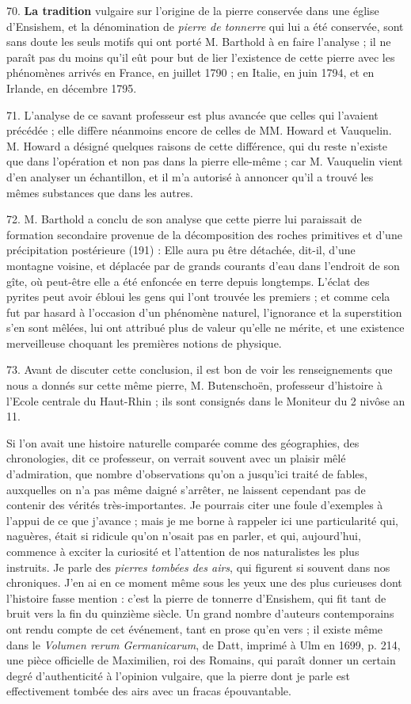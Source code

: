 \documentclass[a4paper, 11pt, oneside, polutonikogreek, french]{article}
\begin{document}
70. \textbf{La tradition} vulgaire sur l'origine de la pierre conservée dans une église d'Ensishem, et la dénomination de \emph{pierre de tonnerre} qui lui a été conservée, sont sans doute les seuls motifs qui ont porté M. Barthold à en faire l'analyse ; il ne paraît pas du moins qu'il eût pour but de lier l'existence de cette pierre avec les phénomènes arrivés en France, en juillet 1790 ; en Italie, en juin 1794, et en Irlande, en décembre 1795.

71. L'analyse de ce savant professeur est plus avancée que celles qui l'avaient précédée ; elle diffère néanmoins encore de celles de MM. Howard et Vauquelin. M. Howard a désigné quelques raisons de cette différence, qui du reste n'existe que dans l'opération et non pas dans la pierre elle-même ; car M. Vauquelin vient d'en analyser un échantillon, et il m'a autorisé à annoncer qu'il a trouvé les mêmes substances que dans les autres.

72. M. Barthold a conclu de son analyse que cette pierre lui paraissait de formation secondaire provenue de la décomposition des roches primitives et d'une précipitation postérieure (191) : \og Elle aura pu être détachée, dit-il, d'une montagne voisine, et déplacée par de grands courants d'eau dans l'endroit de son gîte, où peut-être elle a été enfoncée en terre depuis longtemps. L'éclat des pyrites peut avoir ébloui les gens qui l'ont trouvée les premiers ; et comme cela fut par hasard à l'occasion d'un phénomène naturel, l'ignorance et la superstition s'en sont mêlées, lui ont attribué plus de valeur qu'elle ne mérite, et une existence merveilleuse choquant les premières notions de physique. \fg

73. Avant de discuter cette conclusion, il est bon de voir les renseignements que nous a donnés sur cette même pierre, M. Butenschoën, professeur d'histoire à l'Ecole centrale du Haut-Rhin ; ils sont consignés dans le Moniteur du 2 nivôse an 11.

\og Si l'on avait une histoire naturelle comparée comme des géographies, des chronologies, dit ce professeur, on verrait souvent avec un plaisir mêlé d'admiration, que nombre d'observations qu'on a jusqu'ici traité de fables, auxquelles on n'a pas même daigné s'arrêter, ne laissent cependant pas de contenir des vérités très-importantes. Je pourrais citer une foule d'exemples à l'appui de ce que j'avance ; mais je me borne à rappeler ici une particularité qui, naguères, était si ridicule qu'on n'osait pas en parler, et qui, aujourd'hui, commence à exciter la curiosité et l'attention de nos naturalistes les plus instruits. Je parle des \emph{pierres tombées des airs}, qui figurent si souvent dans nos chroniques. J'en ai en ce moment même sous les yeux une des plus curieuses dont l'histoire fasse mention : c'est la pierre de tonnerre d'Ensishem, qui fit tant de bruit vers la fin du quinzième siècle. Un grand nombre d'auteurs contemporains ont rendu compte de cet événement, tant en prose qu'en vers ; il existe même dans le \emph{Volumen rerum Germanicarum}, de Datt, imprimé à Ulm en 1699, p. 214, une pièce officielle de Maximilien, roi des Romains, qui paraît donner un certain degré d'authenticité à l'opinion vulgaire, que la pierre dont je parle est effectivement tombée des airs avec un fracas épouvantable. \fg
\end{document}
